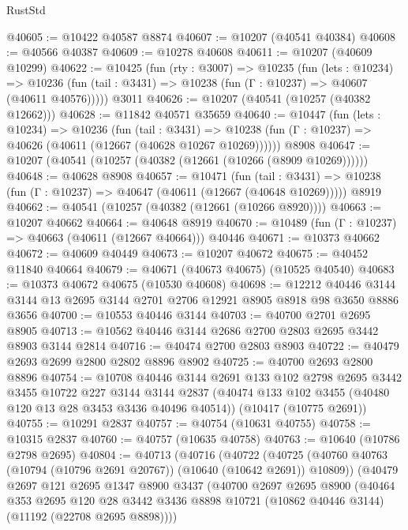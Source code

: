 \begin{lexlean}{RustStd}
\begin{coremodule}
@40605 := @10422 @40587 @8874
@40607 := @10207 (@40541 @40384)
@40608 := @40566 @40387
@40609 := @10278 @40608
@40611 := @10207 (@40609 @10299)
@40622 := @10425
    (fun (rty : @3007) =>
    @10235
      (fun (lets : @10234) =>
      @10236 (fun (tail : @3431) => @10238 (fun (Γ : @10237) => @40607 (@40611 @40576)))))
    @3011
@40626 := @10207 (@40541 (@10257 (@40382 @12662)))
@40628 := @11842 @40571 @35659
@40640 := @10447
    (fun (lets : @10234) =>
    @10236
      (fun (tail : @3431) =>
      @10238 (fun (Γ : @10237) => @40626 (@40611 (@12667 (@40628 @10267 @10269))))))
    @8908
@40647 := @10207 (@40541 (@10257 (@40382 (@12661 (@10266 (@8909 @10269))))))
@40648 := @40628 @8908
@40657 := @10471
    (fun (tail : @3431) => @10238 (fun (Γ : @10237) => @40647 (@40611 (@12667 (@40648 @10269)))))
    @8919
@40662 := @40541 (@10257 (@40382 (@12661 (@10266 @8920))))
@40663 := @10207 @40662
@40664 := @40648 @8919
@40670 := @10489 (fun (Γ : @10237) => @40663 (@40611 (@12667 @40664))) @40446
@40671 := @10373 @40662
@40672 := @40609 @40449
@40673 := @10207 @40672
@40675 := @40452 @11840 @40664
@40679 := @40671 (@40673 @40675) (@10525 @40540)
@40683 := @10373 @40672 @40675 (@10530 @40608)
@40698 := @12212
    @40446
    @3144
    @3144
    @13
    @2695
    @3144
    @2701
    @2706
    @12921
    @8905
    @8918
    @98
    @3650
    @8886
    @3656
@40700 := @10553 @40446 @3144
@40703 := @40700 @2701 @2695 @8905
@40713 := @10562 @40446 @3144 @2686 @2700 @2803 @2695 @3442 @8903 @3144 @2814
@40716 := @40474 @2700 @2803 @8903
@40722 := @40479 @2693 @2699 @2800 @2802 @8896 @8902
@40725 := @40700 @2693 @2800 @8896
@40754 := @10708
    @40446
    @3144
    @2691
    @133
    @102
    @2798
    @2695
    @3442
    @3455
    @10722
    @227
    @3144
    @3144
    @2837
    (@40474 @133 @102 @3455 (@40480 @120 @13 @28 @3453 @3436 @40496 @40514))
    (@10417 (@10775 @2691))
@40755 := @10291 @2837
@40757 := @40754 (@10631 @40755)
@40758 := @10315 @2837
@40760 := @40757 (@10635 @40758)
@40763 := @10640 (@10786 @2798 @2695)
@40804 := @40713
    (@40716
      (@40722
        (@40725 (@40760 @40763 (@10794 (@10796 @2691 @20767)) (@10640 (@10642 @2691)) @10809))
        (@40479
          @2697
          @121
          @2695
          @1347
          @8900
          @3437
          (@40700
            @2697
            @2695
            @8900
            (@40464
              @353
              @2695
              @120
              @28
              @3442
              @3436
              @8898
              @10721
              (@10862 @40446 @3144)
              (@11192 (@22708 @2695 @8898))))

\end{coremodule}
\end{lexlean}
